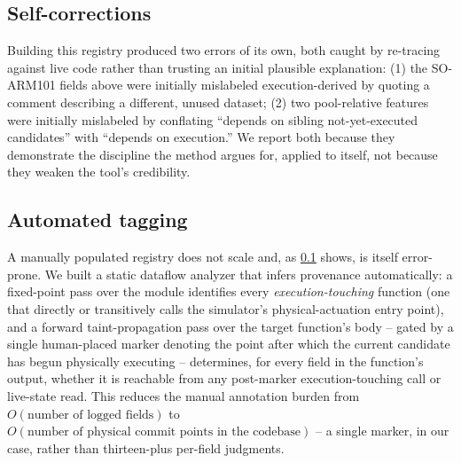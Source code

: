 \documentclass[journal]{IEEEtran}
\begin{document}
\subsection{Self-corrections}
\label{sec:selfcorrections}

Building this registry produced two errors of its own, both caught by
re-tracing against live code rather than trusting an initial plausible
explanation: (1) the SO-ARM101 fields above were initially mislabeled
execution-derived by quoting a comment describing a different, unused
dataset; (2) two pool-relative features were initially mislabeled by
conflating ``depends on sibling not-yet-executed candidates'' with
``depends on execution.'' We report both because they demonstrate the
discipline the method argues for, applied to itself, not because they
weaken the tool's credibility.

\subsection{Automated tagging}
\label{sec:autotag}

A manually populated registry does not scale and, as
\cref{sec:selfcorrections} shows, is itself error-prone. We built a
static dataflow analyzer that infers provenance automatically: a
fixed-point pass over the module identifies every \emph{execution-touching}
function (one that directly or transitively calls the simulator's
physical-actuation entry point), and a forward taint-propagation pass over
the target function's body -- gated by a single human-placed marker
denoting the point after which the current candidate has begun physically
executing -- determines, for every field in the function's output,
whether it is reachable from any post-marker execution-touching call or
live-state read. This reduces the manual annotation burden from
$O(\text{number of logged fields})$ to $O(\text{number of physical commit
points in the codebase})$ -- a single marker, in our case, rather than
thirteen-plus per-field judgments.
\end{document}
